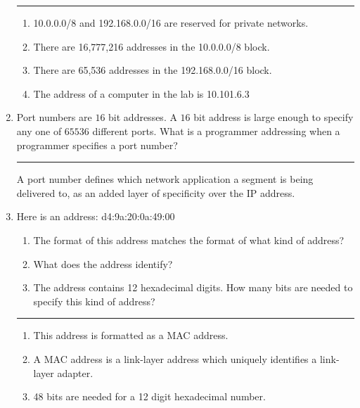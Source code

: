 \documentclass[twoside]{article}
\newenvironment{answer}
  {\vspace*{0.2cm} \rule{12cm}{0.04cm} \vspace*{0.2cm}}
  {\vspace*{0.2cm}}
\begin{document}
\begin{enumerate}
  \begin{answer}

  \begin{enumerate}
    \item 10.0.0.0/8 and 192.168.0.0/16 are reserved for private networks.
    \item There are 16,777,216 addresses in the 10.0.0.0/8 block.
    \item There are 65,536 addresses in the 192.168.0.0/16 block.
    \item The address of a computer in the lab is 10.101.6.3
    \end{enumerate}

    \end{answer}

  \item Port numbers are $16$ bit addresses. A $16$ bit address is large
    enough to specify any one of $65536$ different ports. What is a programmer
    addressing when a programmer specifies a port number?

  \begin{answer}
    A port number defines which network application a segment is being delivered to, as an 
    added layer of specificity over the IP address.
    \end{answer}

  \item Here is an address: d4:9a:20:0a:49:00
  \begin{enumerate}
    \item The format of this address matches the format of what kind of address?
    \item What does the address identify?
    \item The address contains 12 hexadecimal digits. How many bits are needed
      to specify this kind of address?
    \end{enumerate}
  
  \begin{answer}

  \begin{enumerate}
    \item This address is formatted as a MAC address.
    \item A MAC address is a link-layer address which uniquely identifies a link-layer 
    	adapter.
    \item 48 bits are needed for a 12 digit hexadecimal number.
    \end{enumerate}

    \end{answer}


\end{enumerate}
\end{document}
